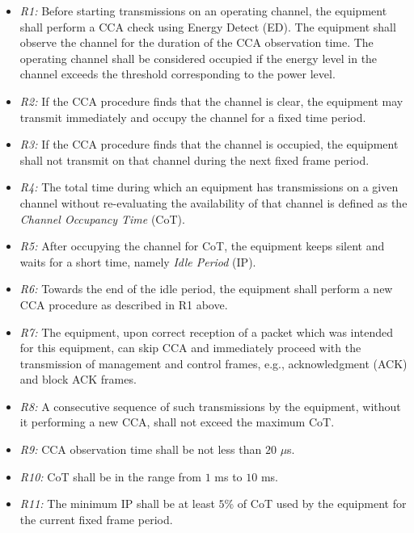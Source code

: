 \begin{itemize}
	
	\item
	\textit{R1:} Before starting transmissions on an operating channel, the equipment shall perform a CCA check using Energy Detect (ED). The equipment shall observe the channel for the duration of the CCA observation time. The operating channel shall be considered occupied if the energy level in the channel exceeds the threshold corresponding to the power level.
	
	\item
	\textit{R2:}
	If the CCA procedure finds that the channel is clear, the equipment may transmit immediately and occupy the channel for a fixed time period.
	
	\item
	\textit{R3:} If the CCA procedure finds that the channel is occupied, the equipment shall not transmit on that channel during the next fixed frame period.
	
	\item
	\textit{R4:} The total time during which an equipment has transmissions on a given channel without re-evaluating the availability of that channel is defined as the \textit{Channel Occupancy Time} (CoT).
	
	\item
	\textit{R5:} After occupying the channel for CoT, the equipment keeps silent and waits for a short time, namely \textit{Idle Period} (IP).
	
	\item
	\textit{R6:} Towards the end of the idle period, the equipment shall perform a new CCA procedure as described in R1 above.
	
	\item
	\textit{R7:} The equipment, upon correct reception of a packet which was intended for this equipment, can skip CCA and immediately proceed with the transmission of management and control frames, e.g., acknowledgment (ACK) and block ACK frames.
	
	\item
	\textit{R8:}
	A consecutive sequence of such transmissions by the equipment, without it performing a new CCA, shall not exceed the maximum CoT.
	
	\item
	\textit{R9:}
	CCA observation time shall be not less than $20$ $\mu$s.
	
	\item
	\textit{R10:} CoT shall be in the range from $1$ ms to $10$ ms.
	
	\item
	\textit{R11:}
	The minimum IP shall be at least $5$\% of CoT used by the equipment for the current fixed frame period.
	
\end{itemize}

